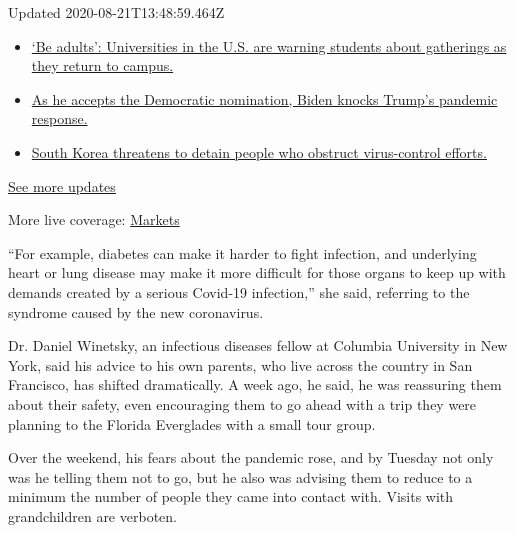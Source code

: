 Updated 2020-08-21T13:48:59.464Z

\begin{itemize}
\tightlist
\item
  \href{https://www.nytimes3xbfgragh.onion/2020/08/21/world/covid-19-coronavirus.html?action=click\&pgtype=Article\&state=default\&region=MAIN_CONTENT_1\&context=storylines_live_updates\#link-6a60a19d}{`Be
  adults': Universities in the U.S. are warning students about
  gatherings as they return to campus.}
\item
  \href{https://www.nytimes3xbfgragh.onion/2020/08/21/world/covid-19-coronavirus.html?action=click\&pgtype=Article\&state=default\&region=MAIN_CONTENT_1\&context=storylines_live_updates\#link-324af071}{As
  he accepts the Democratic nomination, Biden knocks Trump's pandemic
  response.}
\item
  \href{https://www.nytimes3xbfgragh.onion/2020/08/21/world/covid-19-coronavirus.html?action=click\&pgtype=Article\&state=default\&region=MAIN_CONTENT_1\&context=storylines_live_updates\#link-191d44be}{South
  Korea threatens to detain people who obstruct virus-control efforts.}
\end{itemize}

\href{https://www.nytimes3xbfgragh.onion/2020/08/21/world/covid-19-coronavirus.html?action=click\&pgtype=Article\&state=default\&region=MAIN_CONTENT_1\&context=storylines_live_updates}{See
more updates}

More live coverage:
\href{https://www.nytimes3xbfgragh.onion/live/2020/08/21/business/stock-market-today-coronavirus?action=click\&pgtype=Article\&state=default\&region=MAIN_CONTENT_1\&context=storylines_live_updates}{Markets}

``For example, diabetes can make it harder to fight infection, and
underlying heart or lung disease may make it more difficult for those
organs to keep up with demands created by a serious Covid-19
infection,'' she said, referring to the syndrome caused by the new
coronavirus.

Dr. Daniel Winetsky, an infectious diseases fellow at Columbia
University in New York, said his advice to his own parents, who live
across the country in San Francisco, has shifted dramatically. A week
ago, he said, he was reassuring them about their safety, even
encouraging them to go ahead with a trip they were planning to the
Florida Everglades with a small tour group.

Over the weekend, his fears about the pandemic rose, and by Tuesday not
only was he telling them not to go, but he also was advising them to
reduce to a minimum the number of people they came into contact with.
Visits with grandchildren are verboten.

